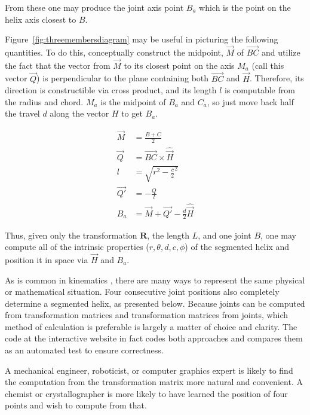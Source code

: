 \documentclass[mathematics,article,submit,pdftex,moreauthors]{Definitions/mdpi}
\begin{document}
From these one may produce the joint axis point $B_a$ which is the
point on the helix axis closest to $B$.

Figure~\ref{fig:threemembersdiagram}
may be useful in picturing the following quantities.
To do this, conceptually construct the midpoint,
$\overrightarrow{M}$
of $\overrightarrow{BC}$ and utilize the fact that the vector
from $\overrightarrow{M}$ to its closest point on the axis $M_a$ (call this vector $\overrightarrow{Q}$) is perpendicular
to the plane containing both $\overrightarrow{BC}$ and $\overrightarrow{H}$. Therefore,
its direction is constructible via cross product, and
its length $l$ is computable from the radius and chord. $M_a$
is the midpoint of $B_a$ and $C_a$, so just move back
half the travel $d$ along the vector $H$ to get $B_a$.

\begin{align}
  \overrightarrow{M} &= \frac{B + C}{2} \\
  \overrightarrow{Q} &= \overrightarrow{BC} \times \hat{\overrightarrow{H}} \\
  l &= \sqrt{r^2 - \frac{c}{2}^2} \\
  \overrightarrow{Q'} &= -\frac{Q}{l} \\
  B_a &= \overrightarrow{M} + \overrightarrow{Q'} - \frac{d}{2}\hat{\overrightarrow{H}}
\end{align}

Thus, given only the transformation $\bm{R}$, the length $L$, and one
joint $B$, one may compute all of the intrinsic properties
($r,\theta,d,c,\phi$) of
the segmented helix and position it in space via $\overrightarrow{H}$ and $B_a$.

As is common in kinematics \cite{funda1990computational}, there are many ways to represent
the same physical or mathematical situation.
Four consecutive joint positions also completely determine a segmented helix, as presented below.
Because joints can be computed from transformation
matrices and transformation matrices from joints,
which method of calculation is preferable is largely
a matter of choice and clarity.
The code at the interactive website
in fact codes both approaches and compares them as an automated test to ensure
correctness.

A mechanical engineer, roboticist, or computer graphics expert is
likely to find the computation from the
transformation matrix more natural and convenient.
A chemist or crystallographer is more likely to
have learned the position of four points and wish to compute from that.
\end{document}
